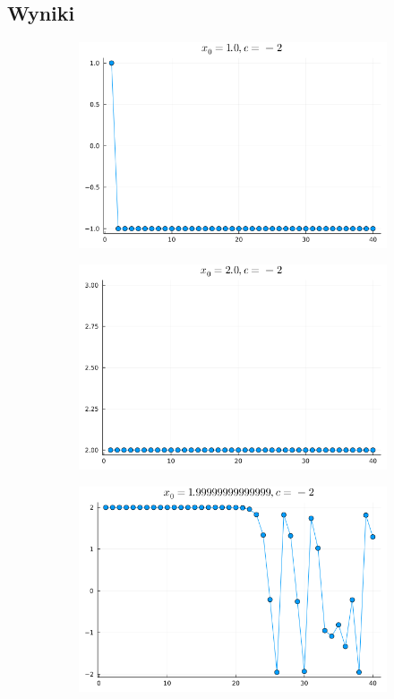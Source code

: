 \documentclass{article}
\def\v{0.47}
\begin{document}
\subsection{Wyniki}
	\begin{figure}[h!]
		\centering
		\begin{subfigure}[b]{\v\linewidth}
			\includegraphics[width=\linewidth]{graphs/1.png}
		\end{subfigure}
		\begin{subfigure}[b]{\v\linewidth}
			\includegraphics[width=\linewidth]{graphs/2.png}
		\end{subfigure}
		\begin{subfigure}[b]{\v\linewidth}
			\includegraphics[width=\linewidth]{graphs/3.png}

\end{subfigure}
\end{figure}
\end{document}

